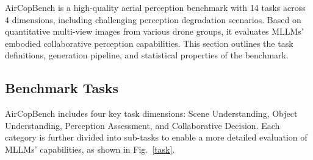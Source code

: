 \documentclass[letterpaper]{article} %
\begin{document}
AirCopBench is a high-quality aerial perception benchmark with 14 tasks across 4 dimensions, including challenging perception degradation scenarios. Based on quantitative multi-view images from various drone groups, it evaluates MLLMs' embodied collaborative perception capabilities. This section outlines the task definitions, generation pipeline, and statistical properties of the benchmark.





\subsection{Benchmark Tasks}

AirCopBench includes four key task dimensions: Scene Understanding, Object Understanding, Perception Assessment, and Collaborative Decision. Each category is further divided into sub-tasks to enable a more detailed evaluation of MLLMs' capabilities, as shown in Fig.~\ref{task}.

\end{document}
